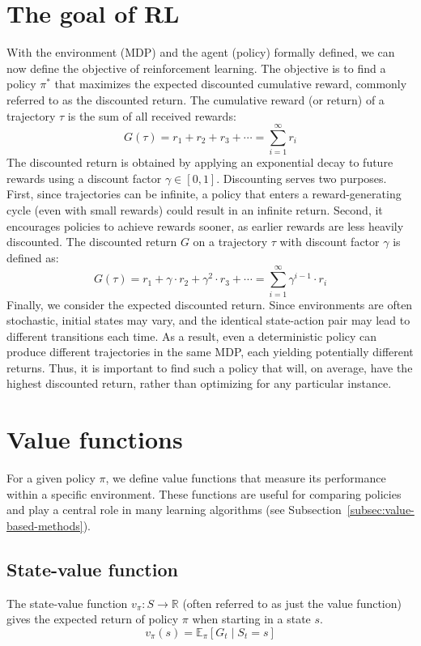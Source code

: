 \documentclass[
  digital,     %
  oneside,     %
  nosansbold,  %
  nocolorbold, %
  lof,         %
  lot,         %
]{fithesis4}
\begin{document}
\section{The goal of RL}
\label{sec:goal}
With the environment (MDP) and the agent (policy) formally defined, we can now define the objective of reinforcement learning. The objective is to find a policy $\pi^*$ that maximizes the expected discounted cumulative reward, commonly referred to as the discounted return. The cumulative reward (or return) of a trajectory $\tau$ is the sum of all received rewards:
\begin{equation}
G(\tau) = r_1+r_2+r_3+\dotsb = \sum_{i=1}^{\infty} r_i
\end{equation}
The discounted return is obtained by applying an exponential decay to future rewards using a discount factor $\gamma \in [0,1]$. Discounting serves two purposes. First, since trajectories can be infinite, a policy that enters a reward-generating cycle (even with small rewards) could result in an infinite return. Second, it encourages policies to achieve rewards sooner, as earlier rewards are less heavily discounted. The discounted return $G$ on a trajectory $\tau$ with discount factor $\gamma$ is defined as:
\begin{equation}
G(\tau)=r_1+\gamma \cdot r_2+ \gamma^2 \cdot r_3+\dotsb = \sum_{i=1}^{\infty} \gamma^{i-1}\cdot r_{i}
\end{equation}
Finally, we consider the expected discounted return. Since environments are often stochastic, initial states may vary, and the identical state-action pair may lead to different transitions each time. As a result, even a deterministic policy can produce different trajectories in the same MDP, each yielding potentially different returns. Thus, it is important to find such a policy that will, on average, have the highest discounted return, rather than optimizing for any particular instance.

\section{Value functions}

For a given policy $\pi$, we define value functions that measure its performance within a specific environment. These functions are useful for comparing policies and play a central role in many learning algorithms (see Subsection~\ref{subsec:value-based-methods}).

\subsection{State-value function}
\label{subsec:state_value_func}
The state-value function $v_\pi\colon S\to \mathbb{R}$ (often referred to as just the value function) gives the expected return of policy $\pi$ when starting in a state $s$.
\begin{equation}
v_\pi(s) = \mathbb{E}_\pi [G_t\mid S_t=s]
\end{equation}
\end{document}
